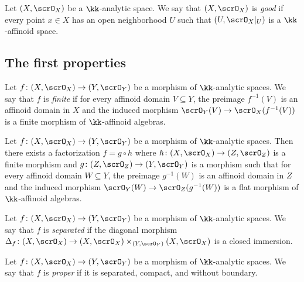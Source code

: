     \begin{definition}\label{def:good_analytic_space}
        Let \((X, \scrO_X)\) be a \(\kk\)-analytic space. 
        We say that \((X, \scrO_X)\) is \emph{good} if every point \(x \in X\) has an open neighborhood \(U\) such that \((U, \scrO_X|_U)\) is a \(\kk\)-affinoid space.
    \end{definition}


\subsection{The first properties}

    \begin{definition}\label{def:finite_morphism_between_analytic_space}
        Let \(f \colon (X, \scrO_X) \to (Y, \scrO_Y)\) be a morphism of \(\kk\)-analytic spaces. 
        We say that \(f\) is \emph{finite} if for every affinoid domain \(V \subseteq Y\), the preimage \(f^{-1}(V)\) is an affinoid domain in \(X\) and the induced morphism \(\scrO_Y(V) \to \scrO_X(f^{-1}(V))\) is a finite morphism of \(\kk\)-affinoid algebras.
        \Yang{}
    \end{definition}

    \begin{theorem}\label{thm:Stein_factoriation_of_analytic_space}
        Let \(f \colon (X, \scrO_X) \to (Y, \scrO_Y)\) be a morphism of \(\kk\)-analytic spaces. 
        Then there exists a factorization \(f = g \circ h\) where \(h \colon (X, \scrO_X) \to (Z, \scrO_Z)\) is a finite morphism and \(g \colon (Z, \scrO_Z) \to (Y, \scrO_Y)\) is a morphism such that for every affinoid domain \(W \subseteq Y\), the preimage \(g^{-1}(W)\) is an affinoid domain in \(Z\) and the induced morphism \(\scrO_Y(W) \to \scrO_Z(g^{-1}(W))\) is a flat morphism of \(\kk\)-affinoid algebras.
        \Yang{}
    \end{theorem}

    \begin{definition}\label{def:seperated_morphism_between_analytic_space}
        Let \(f \colon (X, \scrO_X) \to (Y, \scrO_Y)\) be a morphism of \(\kk\)-analytic spaces. 
        We say that \(f\) is \emph{separated} if the diagonal morphism \(\Delta_f \colon (X, \scrO_X) \to (X, \scrO_X) \times_{(Y, \scrO_Y)} (X, \scrO_X)\) is a closed immersion.
        \Yang{}
    \end{definition}

    \begin{definition}\label{def:proper_morphism_between_analytic_space}
        Let \(f \colon (X, \scrO_X) \to (Y, \scrO_Y)\) be a morphism of \(\kk\)-analytic spaces. 
        We say that \(f\) is \emph{proper} if it is separated, compact, and without boundary.
        \Yang{}
    \end{definition}

